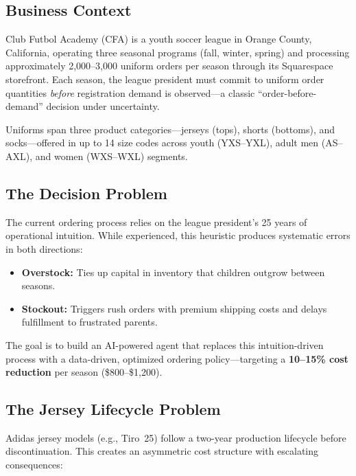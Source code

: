 \documentclass[11pt, letterpaper]{article}
\begin{document}
\subsection{Business Context}

Club Futbol Academy (CFA) is a youth soccer league in Orange County, California, operating three seasonal programs (fall, winter, spring) and processing approximately 2,000--3,000 uniform orders per season through its Squarespace storefront. Each season, the league president must commit to uniform order quantities \emph{before} registration demand is observed---a classic ``order-before-demand'' decision under uncertainty.

Uniforms span three product categories---jerseys (tops), shorts (bottoms), and socks---offered in up to 14 size codes across youth (YXS--YXL), adult men (AS--AXL), and women (WXS--WXL) segments.

\subsection{The Decision Problem}

The current ordering process relies on the league president's 25 years of operational intuition. While experienced, this heuristic produces systematic errors in both directions:
\begin{itemize}[nosep]
    \item \textbf{Overstock:} Ties up capital in inventory that children outgrow between seasons.
    \item \textbf{Stockout:} Triggers rush orders with premium shipping costs and delays fulfillment to frustrated parents.
\end{itemize}

The goal is to build an AI-powered agent that replaces this intuition-driven process with a data-driven, optimized ordering policy---targeting a \textbf{10--15\% cost reduction} per season (\$800--\$1,200).

\subsection{The Jersey Lifecycle Problem}

Adidas jersey models (e.g., Tiro~25) follow a two-year production lifecycle before discontinuation. This creates an asymmetric cost structure with escalating consequences:
\end{document}
